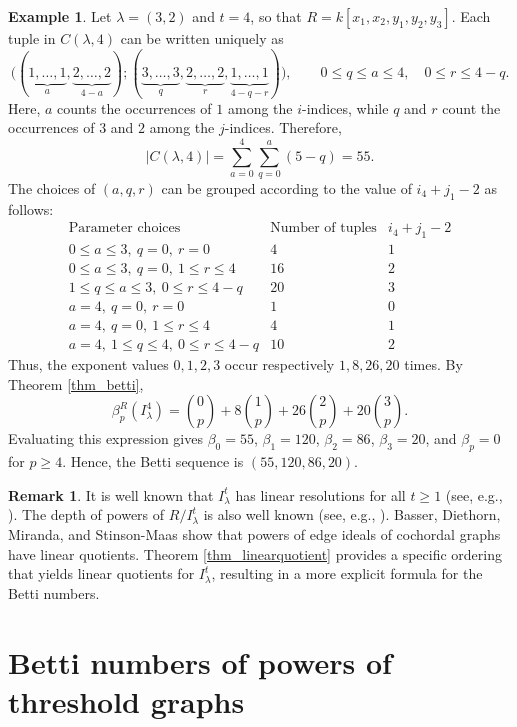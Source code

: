 \documentclass[12pt,amscd]{amsart}
\theoremstyle{definition}
\newtheorem{exam}[thm]{Example}
\newtheorem{rem}[thm]{Remark}
\numberwithin{equation}{section}
\begin{document}
\begin{exam}
Let $\lambda=(3,2)$ and $t=4$, so that $R=k[x_1,x_2,y_1,y_2,y_3]$. Each tuple in $C(\lambda,4)$ can be written uniquely as
\[
\bigl((\underbrace{1,\ldots,1}_{a},\underbrace{2,\ldots,2}_{4-a});
      (\underbrace{3,\ldots,3}_{q},\underbrace{2,\ldots,2}_{r},
       \underbrace{1,\ldots,1}_{4-q-r})\bigr),
\qquad 0\le q\le a\le 4,\quad 0\le r\le 4-q.
\]
Here, $a$ counts the occurrences of $1$ among the $i$-indices, while $q$ and $r$ count the occurrences of $3$ and $2$ among the $j$-indices. Therefore,
\[
|C(\lambda,4)|=\sum_{a=0}^4\sum_{q=0}^a(5-q)=55.
\]
The choices of $(a,q,r)$ can be grouped according to the value of $i_4+j_1-2$ as follows:
\[
\begin{array}{c|c|c}
\text{Parameter choices} & \text{Number of tuples} & i_4+j_1-2 \\
\hline
0\le a\le3,\ q=0,\ r=0 & 4 & 1 \\
0\le a\le3,\ q=0,\ 1\le r\le4 & 16 & 2 \\
1\le q\le a\le3,\ 0\le r\le4-q & 20 & 3 \\
a=4,\ q=0,\ r=0 & 1 & 0 \\
a=4,\ q=0,\ 1\le r\le4 & 4 & 1 \\
a=4,\ 1\le q\le4,\ 0\le r\le4-q & 10 & 2
\end{array}
\]
Thus, the exponent values $0,1,2,3$ occur respectively $1,8,26,20$ times. By Theorem \ref{thm_betti},
\[
\beta_p^R(I_{\lambda}^4)
=\binom{0}{p}+8\binom{1}{p}+26\binom{2}{p}+20\binom{3}{p}.
\]
Evaluating this expression gives $\beta_0=55$, $\beta_1=120$, $\beta_2=86$, $\beta_3=20$, and $\beta_p=0$ for $p\ge4$. Hence, the Betti sequence is $(55,120,86,20)$.
\end{exam}

\begin{rem} 
It is well known that $I_\lambda^t$ has linear resolutions for all $t \ge 1$ (see, e.g., \cite[Theorem 3.2]{HHZ}). The depth of powers of $R/I_\lambda^t$ is also well known (see, e.g., \cite[Proposition 2.18]{HV}). Basser, Diethorn, Miranda, and Stinson-Maas \cite[Theorem 3.11]{BDMS} show that powers of edge ideals of cochordal graphs have linear quotients. Theorem \ref{thm_linearquotient} provides a specific ordering that yields linear quotients for $I_\lambda^t$, resulting in a more explicit formula for the Betti numbers.
\end{rem}

\section{Betti numbers of powers of threshold graphs}
\end{document}
